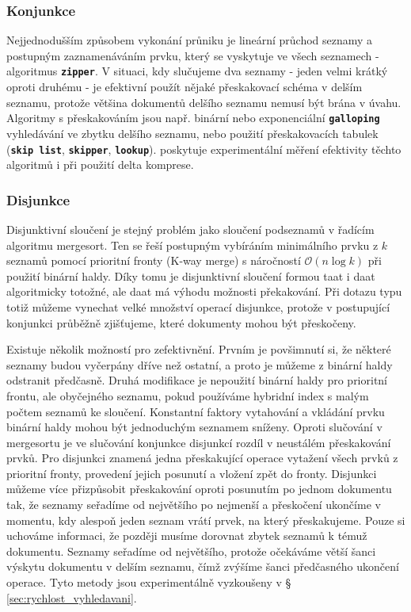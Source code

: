 \documentclass[11pt,letterpaper,oneside,openright]{book}
\newcommand{\bftt}[1]{\texttt{\textbf{#1}}}
\begin{document}
\subsubsection{Konjunkce}
Nejjednodušším způsobem vykonání průniku je lineární průchod seznamy a postupným
zaznamenáváním prvku, který se vyskytuje ve všech seznamech - algoritmus
\bftt{zipper}. V situaci, kdy slučujeme dva seznamy - jeden velmi krátký oproti
druhému - je efektivní použít nějaké přeskakovací schéma v delším seznamu,
protože většina dokumentů delšího seznamu nemusí být brána v úvahu. Algoritmy s
přeskakováním jsou např. binární nebo exponenciální \bftt{galloping}
vyhledávání ve zbytku delšího seznamu, nebo použití přeskakovacích tabulek
(\bftt{skip list}, \bftt{skipper}, \bftt{lookup}).
\cite{Sanders:2007:III:2791188.2791195} poskytuje experimentální měření
efektivity těchto algoritmů i při použití delta komprese.

\subsubsection{Disjunkce} \label{sec:disjunctive_merge}
Disjunktivní sloučení je stejný problém jako sloučení podseznamů v řadícím
algoritmu mergesort. Ten se řeší postupným vybíráním minimálního prvku z $k$
seznamů pomocí prioritní fronty (K-way merge) s náročností $\mathcal{O}(n \log
k)$ při použití binární haldy. Díky tomu je disjunktivní sloučení formou taat i
daat algoritmicky totožné, ale daat má výhodu možnosti překakování. Při dotazu
typu  totiž můžeme vynechat velké množství operací
disjunkce, protože v postupující konjunkci průběžně zjišťujeme, které dokumenty
mohou být přeskočeny.

Existuje několik možností pro zefektivnění. Prvním je povšimnutí si, že některé
seznamy budou vyčerpány dříve než ostatní, a proto je můžeme z binární haldy
odstranit předčasně. Druhá modifikace je nepoužití binární haldy pro prioritní
frontu, ale obyčejného seznamu, pokud používáme hybridní index s malým počtem
seznamů ke sloučení. Konstantní faktory vytahování a vkládání prvku binární
haldy mohou být jednoduchým seznamem sníženy. Oproti slučování v mergesortu je
ve slučování konjunkce disjunkcí rozdíl v neustálém přeskakování prvků. Pro
disjunkci znamená jedna přeskakující operace vytažení všech prvků z prioritní
fronty, provedení jejich posunutí a vložení zpět do fronty. Disjunkci můžeme
více přizpůsobit přeskakování oproti posunutím po jednom dokumentu tak, že
seznamy seřadíme od největšího po nejmenší a přeskočení ukončíme v momentu, kdy
alespoň jeden seznam vrátí prvek, na který přeskakujeme. Pouze si uchováme
informaci, že později musíme dorovnat zbytek seznamů k témuž dokumentu. Seznamy
seřadíme od největšího, protože očekáváme větší šanci výskytu dokumentu v
delším seznamu, čímž zvýšíme šanci předčasného ukončení operace. Tyto metody
jsou experimentálně vyzkoušeny v \S\,\ref{sec:rychlost_vyhledavani}.
\end{document}
